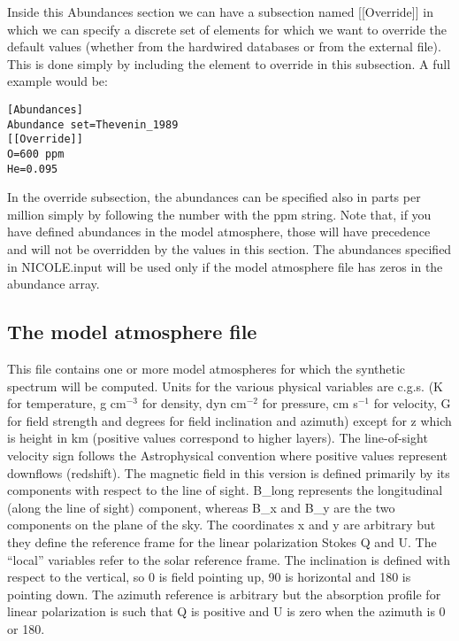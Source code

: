 Inside this Abundances section we can have a subsection named
[[Override]] in which we can specify a discrete set of elements for
which we want to override the default values (whether from the
hardwired databases or from the external file). This is done simply by
including the element to override in this subsection. A full example
would be:

\begin{verbatim}
[Abundances]
Abundance set=Thevenin_1989
[[Override]]
O=600 ppm
He=0.095
\end{verbatim}

In the override subsection, the abundances can be specified also in
parts per million simply by following the number with the ppm
string. Note that, if you have defined abundances in the model
atmosphere, those will have precedence and will not be overridden by
the values in this section. The abundances specified in NICOLE.input
will be used only if the model atmosphere file has zeros in the
abundance array.

\subsection{The model atmosphere file}
\label{modelfile}

This file contains one or more model atmospheres for which the
synthetic spectrum will be computed. Units for the various physical
variables are c.g.s. (K for temperature, g cm$^{-3}$ for density, dyn
cm$^{-2}$ for pressure, cm s$^{-1}$ for velocity, G for field strength
and degrees for field inclination and azimuth) except for z which is
height in km (positive values correspond to higher layers). The
line-of-sight velocity sign follows the Astrophysical convention where
positive values represent downflows (redshift). The magnetic field in
this version is defined primarily by its components with respect to
the line of sight. B\_long represents the longitudinal (along the line
of sight) component, whereas B\_x and B\_y are the two components on
the plane of the sky. The coordinates x and y are arbitrary but they
define the reference frame for the linear polarization Stokes Q and
U. The ``local'' variables refer to the solar reference frame. The
inclination is defined with respect to the vertical, so 0 is field
pointing up, 90 is horizontal and 180 is pointing down. The azimuth
reference is arbitrary but the absorption profile for linear
polarization is such that Q is positive and U is zero when the azimuth
is 0 or 180.

